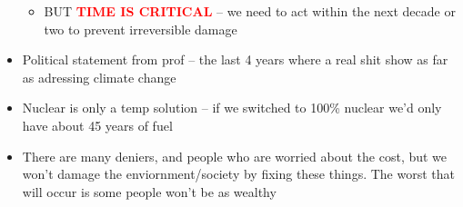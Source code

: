 \documentclass{article}
\theoremstyle{definition}
\begin{document}
\begin{itemize}
\begin{itemize}
			\item BUT \textcolor{red}{\textbf{TIME IS CRITICAL}}  -- we need to act within the next decade or two to prevent irreversible damage
		\end{itemize}
	\item Political statement from prof -- the last 4 years where a real shit show as far as adressing climate change 
	\item Nuclear is only a temp solution -- if we switched to 100\% nuclear we'd only have about 45 years of fuel
	\item There are many deniers, and people who are worried about the cost, but we won't damage the enviornment/society by fixing these things. The worst that will occur is some people won't be as wealthy
\end{itemize}
\end{document}

